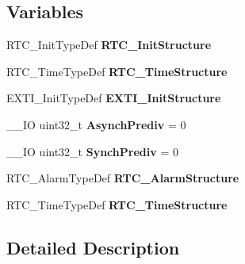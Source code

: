 \subsection*{Variables}
\begin{DoxyCompactItemize}
\item 
\hypertarget{group___p_w_r___s_t_a_n_d_b_y_gabc23e08b50805cf21e9fb10c443c4d09}{R\-T\-C\-\_\-\-Init\-Type\-Def {\bfseries R\-T\-C\-\_\-\-Init\-Structure}}\label{group___p_w_r___s_t_a_n_d_b_y_gabc23e08b50805cf21e9fb10c443c4d09}

\item 
\hypertarget{group___p_w_r___s_t_a_n_d_b_y_ga915c5e6dca96b2d01dd35923a909eb09}{R\-T\-C\-\_\-\-Time\-Type\-Def {\bfseries R\-T\-C\-\_\-\-Time\-Structure}}\label{group___p_w_r___s_t_a_n_d_b_y_ga915c5e6dca96b2d01dd35923a909eb09}

\item 
\hypertarget{group___p_w_r___s_t_a_n_d_b_y_ga2d4257246174aa5cc08c0d13b8b97aeb}{E\-X\-T\-I\-\_\-\-Init\-Type\-Def {\bfseries E\-X\-T\-I\-\_\-\-Init\-Structure}}\label{group___p_w_r___s_t_a_n_d_b_y_ga2d4257246174aa5cc08c0d13b8b97aeb}

\item 
\hypertarget{group___p_w_r___s_t_a_n_d_b_y_ga5e432ff277c4005b7a7d8b220357a1ce}{\-\_\-\-\_\-\-I\-O uint32\-\_\-t {\bfseries Asynch\-Prediv} = 0}\label{group___p_w_r___s_t_a_n_d_b_y_ga5e432ff277c4005b7a7d8b220357a1ce}

\item 
\hypertarget{group___p_w_r___s_t_a_n_d_b_y_ga1e0250314de1748c6f52268d1b99038c}{\-\_\-\-\_\-\-I\-O uint32\-\_\-t {\bfseries Synch\-Prediv} = 0}\label{group___p_w_r___s_t_a_n_d_b_y_ga1e0250314de1748c6f52268d1b99038c}

\item 
\hypertarget{group___p_w_r___s_t_a_n_d_b_y_gaa4fc8fc521debc197e4e3becd4c532a9}{R\-T\-C\-\_\-\-Alarm\-Type\-Def {\bfseries R\-T\-C\-\_\-\-Alarm\-Structure}}\label{group___p_w_r___s_t_a_n_d_b_y_gaa4fc8fc521debc197e4e3becd4c532a9}

\item 
\hypertarget{group___p_w_r___s_t_a_n_d_b_y_ga915c5e6dca96b2d01dd35923a909eb09}{R\-T\-C\-\_\-\-Time\-Type\-Def {\bfseries R\-T\-C\-\_\-\-Time\-Structure}}\label{group___p_w_r___s_t_a_n_d_b_y_ga915c5e6dca96b2d01dd35923a909eb09}

\end{DoxyCompactItemize}


\subsection{Detailed Description}


